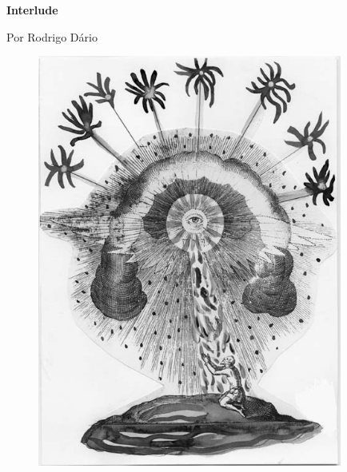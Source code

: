 \begin{absolutelynopagebreak}
\textbf{Interlude}

Por Rodrigo Dário

\thispagestyle{empty}

\begin{vplace}
\begin{figure}[H]
  \centering
  \vspace*{4cm}
  \includegraphics[width=100mm]{./imgs/caparc5.JPG}  

\end{figure}
\end{vplace}

\end{absolutelynopagebreak}

\pagebreak

